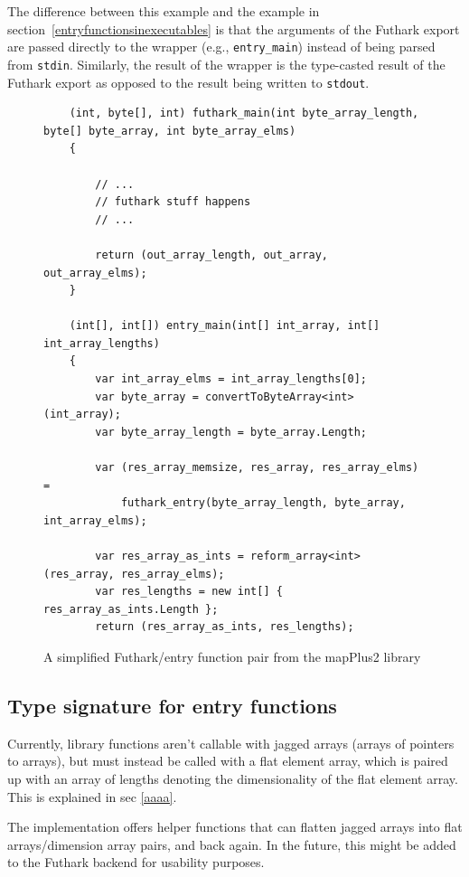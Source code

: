 The difference between this example and the example in 
section~\ref{entryfunctionsinexecutables} is that the arguments of the Futhark export
are passed directly to the wrapper (e.g., {\tt entry\_main}) instead of being parsed
from {\tt stdin}. Similarly, the result of the wrapper is the type-casted result of
the Futhark export as opposed to the result being written to \texttt{stdout}.
\begin{figure}[H]
  \centering
\begin{verbatim}
    (int, byte[], int) futhark_main(int byte_array_length, byte[] byte_array, int byte_array_elms)
    {

        // ...
        // futhark stuff happens
        // ...

        return (out_array_length, out_array, out_array_elms);
    }

    (int[], int[]) entry_main(int[] int_array, int[] int_array_lengths)
    {
        var int_array_elms = int_array_lengths[0];
        var byte_array = convertToByteArray<int>(int_array);
        var byte_array_length = byte_array.Length;

        var (res_array_memsize, res_array, res_array_elms) =
            futhark_entry(byte_array_length, byte_array, int_array_elms);

        var res_array_as_ints = reform_array<int>(res_array, res_array_elms);
        var res_lengths = new int[] { res_array_as_ints.Length };
        return (res_array_as_ints, res_lengths);
\end{verbatim}
  \caption{A simplified Futhark/entry function pair from the mapPlus2 library}
  \label{fig:futharkentrypairlib}
\end{figure}

\subsection{Type signature for entry functions}
\label{subsec:flatarraysinentryfuncs}
Currently, library functions aren't callable with jagged arrays (arrays of 
pointers to arrays), but must instead be called with a flat element array,
which is paired up with an array of lengths denoting the dimensionality of 
the flat element array. This is explained in sec \ref{aaaa}.

The \fshark{} implementation offers helper functions that can flatten jagged
arrays into flat arrays/dimension array pairs, and back again.
In the future, this might be added to the Futhark \csharp{} backend for
usability purposes.

